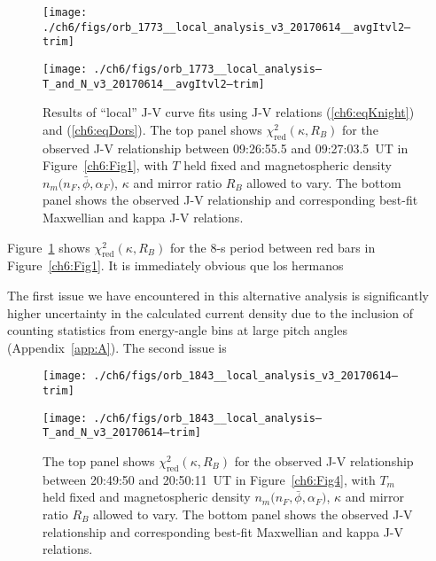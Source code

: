   \begin{figure}
    \centering
    \noindent\texttt{[image: ./ch6/figs/orb\_1773\_\_local\_analysis\_v3\_20170614\_\_avgItvl2--trim]}

    \vspace{1cm}

    \noindent\texttt{[image: ./ch6/figs/orb\_1773\_\_local\_analysis--T\_and\_N\_v3\_20170614\_\_avgItvl2--trim]}

    \caption[Orbit 1773: Reduced chi-squared values for observed ``local'' J-V
    curves and corresponding best-fit curves.]{Results of ``local'' J-V curve
      fits using J-V relations (\ref{ch6:eqKnight}) and (\ref{ch6:eqDors}). The
      top panel shows $\chi^2_{\mathrm{red}} ( \kappa, R_B)$ for the observed
      J-V relationship between 09:26:55.5 and 09:27:03.5~UT in
      Figure~\ref{ch6:Fig1}, with $T$ held fixed and magnetospheric density
      $n_m \big ( n_F, \bar{\phi}, \alpha_F \big )$, $\kappa$ and mirror ratio
      $R_B$ allowed to vary. The bottom panel shows the observed J-V
      relationship and corresponding best-fit Maxwellian and kappa J-V
      relations.}
    \label{ch6:Fig7}
  \end{figure}

  
  Figure~\ref{ch6:Fig7} shows $\chi^2_{\mathrm{red}} ( \kappa, R_B)$ for the
  8-s period between red bars in Figure~\ref{ch6:Fig1}. It is immediately obvious que los hermanos

  The first issue we have encountered in this alternative analysis is 
  significantly higher uncertainty in the calculated current density due to the
  inclusion of counting statistics from energy-angle bins at large pitch angles
  (Appendix~\ref{app:A}). The second issue is

  \begin{figure}
    \centering

    \noindent\texttt{[image: ./ch6/figs/orb\_1843\_\_local\_analysis\_v3\_20170614--trim]}

    \vspace{1cm}

    \noindent\texttt{[image: ./ch6/figs/orb\_1843\_\_local\_analysis--T\_and\_N\_v3\_20170614--trim]}

    \caption[Orbit 1843: Reduced chi-squared values for observed ``local'' J-V
    curves and corresponding best-fit curves.]{The top panel shows
      $\chi^2_{\mathrm{red}} ( \kappa, R_B)$ for the observed J-V relationship
      between 20:49:50 and 20:50:11~UT in Figure~\ref{ch6:Fig4}, with $T_m$ held
      fixed and magnetospheric density
      $n_m \big ( n_F, \bar{\phi}, \alpha_F \big )$, $\kappa$ and mirror ratio
      $R_B$ allowed to vary. The bottom panel shows the observed J-V
      relationship and corresponding best-fit Maxwellian and kappa J-V
      relations.}
    \label{ch6:Fig8}
  \end{figure}

